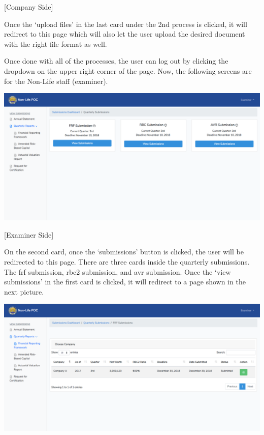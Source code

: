 \documentclass{article}
\begin{document}
[Company Side]%

Once the ‘upload files’ in the last card under the 2nd
process is clicked, it will redirect to this page which will also let
the user upload the desired document with the right file format as
well.%

Once done with all of the processes, the user can log
out by clicking the dropdown on the upper right corner of the page. Now,
the following screens are for the Non-Life staff (examiner).%

\includegraphics[keepaspectratio=true]{up-ic-screens/image186}{}%

[Examiner Side]%

On the second card, once the ‘submissions’ button is
clicked, the user will be redirected to this page. There are three cards
inside the quarterly submissions. The frf
submission, rbc2 submission, and avr submission. Once the ‘view submissions’ in the first card is clicked,
it will redirect to a page shown in the next picture.%

\includegraphics[keepaspectratio=true]{up-ic-screens/image159}{}%
\end{document}
